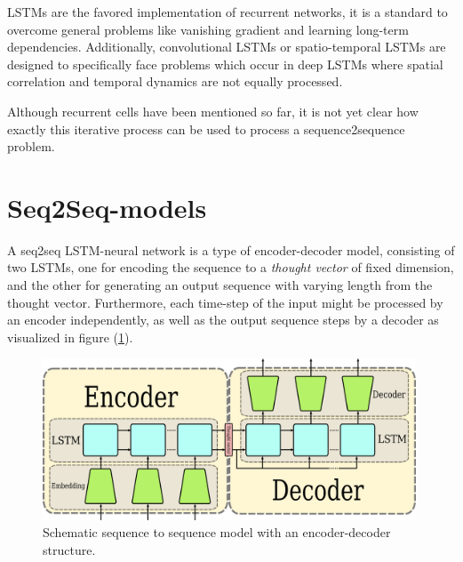 LSTMs are the favored implementation of recurrent networks, it is a standard to overcome general problems like vanishing gradient and learning long-term dependencies. Additionally, convolutional LSTMs or spatio-temporal LSTMs are designed to specifically face problems which occur in deep LSTMs where spatial correlation and temporal dynamics are not equally processed.

Although recurrent cells have been mentioned so far, it is not yet clear how exactly this iterative process can be used to process a sequence2sequence problem.
\section{Seq2Seq-models}\label{cap:seq2seq}
A seq2seq LSTM-neural network is a type of encoder-decoder model, consisting of two LSTMs, one for encoding the sequence to a \textit{thought vector} of fixed dimension, and the other for generating an output sequence with varying length from the thought vector. Furthermore, each time-step of the input might be processed by an encoder independently, as well as the output sequence steps by a decoder as visualized in figure (\ref{fig:seq2seq}). %

\begin{figure}[ht]
    \center
    \includegraphics[width=0.99\textwidth]{figures/seq2seq.png}
	\caption{Schematic sequence to sequence model with an encoder-decoder structure.}
	\label{fig:seq2seq}
\end{figure}


